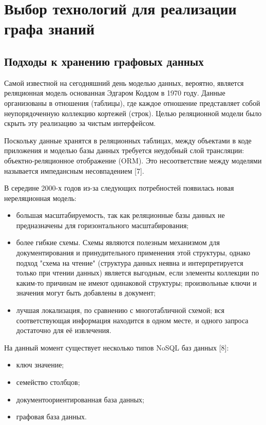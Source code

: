 \chapter{Выбор технологий для реализации графа знаний} \label{ch2}


\section{Подходы к хранению графовых данных}

Самой известной на сегодняшний день моделью данных, вероятно, является реляционная модель основанная Эдгаром Коддом в 1970 году. Данные
организованы в отношения (таблицы), где каждое отношение представляет собой неупорядоченную коллекцию кортежей (строк). Целью реляционной
модели было скрыть эту реализацию за чистым интерфейсом.

Поскольку данные хранятся в реляционных таблицах, между объектами в коде приложения и моделью базы данных требуется неудобный слой
трансляции: объектно-реляционное отображение (ORM). Это несоответствие между моделями называется импедансным несовпадением [7].

В середине 2000-х годов из-за следующих потребностей появилась новая нереляционная модель:

\begin{itemize}
    \item большая масштабируемость, так как реляционные базы данных не предназначены для горизонтального масштабирования;
    \item более гибкие схемы. Схемы являются полезным механизмом для документирования и принудительного применения этой структуры, однако подход "схема на чтение" (структура данных неявна и интерпретируется только при чтении данных) является выгодным, если элементы коллекции по каким-то причинам не имеют одинаковой структуры; произвольные ключи и значения могут быть добавлены в документ;
    \item лучшая локализация, по сравнению с многотабличной схемой; вся соответствующая информация находится в одном месте, и одного запроса достаточно для её извлечения.
\end{itemize}

На данный момент существует несколько типов NoSQL баз данных [8]:

\begin{itemize}
    \item ключ значение;
    \item семейство столбцов;
    \item документоориентированная база данных;
    \item графовая база данных.
\end{itemize}

